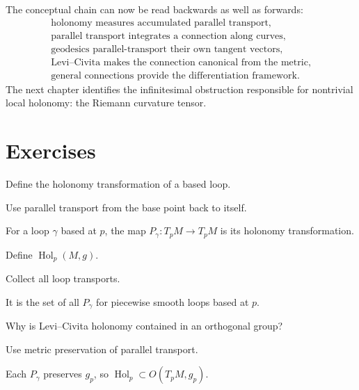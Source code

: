 The conceptual chain can now be read backwards as well as forwards:
\[
\begin{array}{c}
\text{holonomy measures accumulated parallel transport},\\[2mm]
\text{parallel transport integrates a connection along curves},\\[2mm]
\text{geodesics parallel-transport their own tangent vectors},\\[2mm]
\text{Levi--Civita makes the connection canonical from the metric},\\[2mm]
\text{general connections provide the differentiation framework}.
\end{array}
\]
The next chapter identifies the infinitesimal obstruction responsible for
nontrivial local holonomy: the Riemann curvature tensor.

\section{Exercises}

\begin{exercise}\label{exr:vii25-01}
Define the holonomy transformation of a based loop.
\end{exercise}
\begin{hint}
Use parallel transport from the base point back to itself.
\end{hint}
\begin{solution}
For a loop \(\gamma\) based at \(p\), the map \(P_\gamma:T_pM\to T_pM\) is its holonomy transformation.
\end{solution}


\begin{exercise}\label{exr:vii25-02}
Define \(\operatorname{Hol}_p(M,g)\).
\end{exercise}
\begin{hint}
Collect all loop transports.
\end{hint}
\begin{solution}
It is the set of all \(P_\gamma\) for piecewise smooth loops based at \(p\).
\end{solution}


\begin{exercise}\label{exr:vii25-03}
Why is Levi--Civita holonomy contained in an orthogonal group?
\end{exercise}
\begin{hint}
Use metric preservation of parallel transport.
\end{hint}
\begin{solution}
Each \(P_\gamma\) preserves \(g_p\), so \(\operatorname{Hol}_p\subset O(T_pM,g_p)\).
\end{solution}


